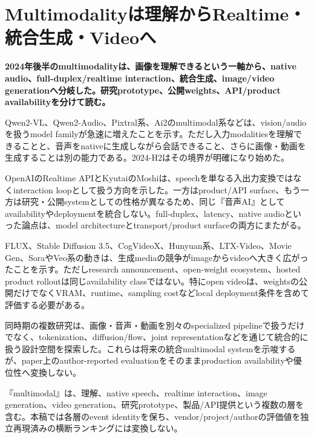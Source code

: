 \section{Multimodalityは理解からRealtime・統合生成・Videoへ}
\label{pkg:multimodal-media}
\noindent\textbf{2024年後半のmultimodalityは、画像を理解できるという一軸から、native audio、full-duplex/realtime interaction、統合生成、image/video generationへ分岐した。研究prototype、公開weights、API/product availabilityを分けて読む。}\autocite{src-4a870e1e2c95,src-c5ed64e39d0c,src-f6c8da8253fb}

Qwen2-VL、Qwen2-Audio、Pixtral系、Ai2のmultimodal系などは、vision/audioを扱うmodel familyが急速に増えたことを示す。ただし入力modalitiesを理解できることと、音声をnativeに生成しながら会話できること、さらに画像・動画を生成することは別の能力である。2024-H2はその境界が明確になり始めた。\autocite{src-56b3abdc51a9,src-72d4a57e9c16,src-9f35f00f9f9c,src-d483c7d9838b,src-feb76866f5df}


OpenAIのRealtime APIとKyutaiのMoshiは、speechを単なる入出力変換ではなくinteraction loopとして扱う方向を示した。一方はproduct/API surface、もう一方は研究・公開systemとしての性格が異なるため、同じ『音声AI』としてavailabilityやdeploymentを統合しない。full-duplex、latency、native audioといった論点は、model architectureとtransport/product surfaceの両方にまたがる。\autocite{src-4a870e1e2c95,src-c5ed64e39d0c}


FLUX、Stable Diffusion 3.5、CogVideoX、Hunyuan系、LTX-Video、Movie Gen、SoraやVeo系の動きは、生成mediaの競争がimageからvideoへ大きく広がったことを示す。ただしresearch announcement、open-weight ecosystem、hosted product rolloutは同じavailability classではない。特にopen videoは、weightsの公開だけでなくVRAM、runtime、sampling costなどlocal deployment条件を含めて評価する必要がある。\autocite{src-06d2114e2823,src-2d134659d4de,src-d1b80acf98c2,src-d33cd3d41599,src-d50c19922f51,src-e91cbf23fde6,src-f6c8da8253fb}


同時期の複数研究は、画像・音声・動画を別々のspecialized pipelineで扱うだけでなく、tokenization、diffusion/flow、joint representationなどを通じて統合的に扱う設計空間を探索した。これらは将来の統合multimodal systemを示唆するが、paper上のauthor-reported evaluationをそのままproduction availabilityや優位性へ変換しない。\autocite{src-25c4073c2a29,src-5ff9bff435a6,src-680a61ed20c0,src-770e33132b09,src-e38a55668df9,src-e7d2578ccb4d,src-f6b059ed7fb2,src-fa0d8178b72a}


\begin{claimboundary}
『multimodal』は、理解、native speech、realtime interaction、image generation、video generation、研究prototype、製品/API提供という複数の層を含む。本稿では各層のevent identityを保ち、vendor/project/authorの評価値を独立再現済みの横断ランキングには変換しない。\autocite{src-c5ed64e39d0c}
\end{claimboundary}
